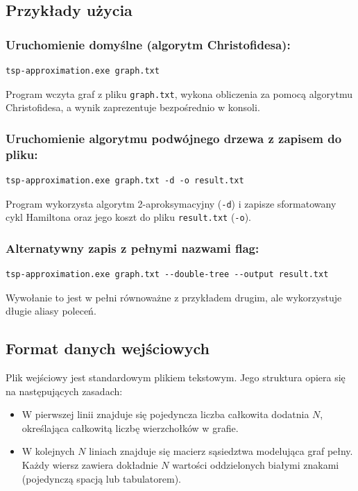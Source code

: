 \documentclass{article}
\theoremstyle{definition}
\theoremstyle{plain}
\theoremstyle{remark}
\begin{document}
\subsection{Przykłady użycia}

\subsubsection*{Uruchomienie domyślne (algorytm Christofidesa):}

\begin{verbatim}
tsp-approximation.exe graph.txt
\end{verbatim}

\noindent
Program wczyta graf z pliku \texttt{graph.txt}, wykona obliczenia za pomocą algorytmu Christofidesa, a wynik zaprezentuje bezpośrednio w konsoli.

\subsubsection*{Uruchomienie algorytmu podwójnego drzewa z zapisem do pliku:}
\begin{verbatim}
tsp-approximation.exe graph.txt -d -o result.txt
\end{verbatim}
Program wykorzysta algorytm 2-aproksymacyjny (\texttt{-d}) i zapisze sformatowany cykl Hamiltona oraz jego koszt do pliku \texttt{result.txt} (\texttt{-o}).

\subsubsection*{Alternatywny zapis z pełnymi nazwami flag:}
\begin{verbatim}
tsp-approximation.exe graph.txt --double-tree --output result.txt
\end{verbatim}
Wywołanie to jest w pełni równoważne z przykładem drugim, ale wykorzystuje długie aliasy poleceń.

\subsection{Format danych wejściowych}

Plik wejściowy jest standardowym plikiem tekstowym. Jego struktura opiera się na następujących zasadach:
\begin{itemize}
    \item W pierwszej linii znajduje się pojedyncza liczba całkowita dodatnia $N$, określająca całkowitą liczbę wierzchołków w grafie.
    \item W kolejnych $N$ liniach znajduje się macierz sąsiedztwa modelująca graf pełny. Każdy wiersz zawiera dokładnie $N$ wartości oddzielonych białymi znakami (pojedynczą spacją lub tabulatorem).
\end{itemize}
\end{document}
